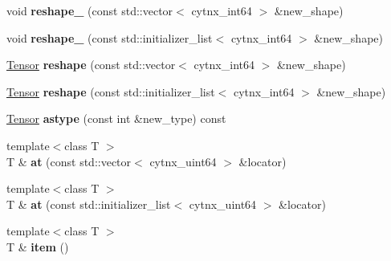 \begin{DoxyCompactItemize}
\mbox{\label{classcytnx_1_1Tensor_a3723449528b9a20dd46c32c9e042b8f0}} 
void {\bfseries reshape\+\_\+} (const std\+::vector$<$ cytnx\+\_\+int64 $>$ \&new\+\_\+shape)
\item 
\mbox{\label{classcytnx_1_1Tensor_a68a1e158cc84a6109117b19882377563}} 
void {\bfseries reshape\+\_\+} (const std\+::initializer\+\_\+list$<$ cytnx\+\_\+int64 $>$ \&new\+\_\+shape)
\item 
\mbox{\label{classcytnx_1_1Tensor_a182f8f7b3ae3d0db8ed55d2adf8c6b45}} 
\hyperlink{classcytnx_1_1Tensor}{Tensor} {\bfseries reshape} (const std\+::vector$<$ cytnx\+\_\+int64 $>$ \&new\+\_\+shape)
\item 
\mbox{\label{classcytnx_1_1Tensor_aaea8f70a35d4f8417f988da922088ff2}} 
\hyperlink{classcytnx_1_1Tensor}{Tensor} {\bfseries reshape} (const std\+::initializer\+\_\+list$<$ cytnx\+\_\+int64 $>$ \&new\+\_\+shape)
\item 
\mbox{\label{classcytnx_1_1Tensor_a7b996d3281e7375b29a7cfe4273b299f}} 
\hyperlink{classcytnx_1_1Tensor}{Tensor} {\bfseries astype} (const int \&new\+\_\+type) const
\item 
\mbox{\label{classcytnx_1_1Tensor_a697b114d1df390ca558ea9211c2d683b}} 
{\footnotesize template$<$class T $>$ }\\T \& {\bfseries at} (const std\+::vector$<$ cytnx\+\_\+uint64 $>$ \&locator)
\item 
\mbox{\label{classcytnx_1_1Tensor_a55d27a38f230d115c5f0c2ee2896117f}} 
{\footnotesize template$<$class T $>$ }\\T \& {\bfseries at} (const std\+::initializer\+\_\+list$<$ cytnx\+\_\+uint64 $>$ \&locator)
\item 
\mbox{\label{classcytnx_1_1Tensor_a7b686c6641c3c1eeb2d34cb7c09e433b}} 
{\footnotesize template$<$class T $>$ }\\T \& {\bfseries item} ()
\item 
\mbox{\label{classcytnx_1_1Tensor_ad7b928e4cb89d40cbd99aefab9aa0075}} 

\end{DoxyCompactItemize}

